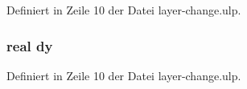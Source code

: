Definiert in Zeile 10 der Datei layer-\/change.\+ulp.

\hypertarget{layer-change_8ulp_a5e9a2bb87d9944b591c7b364e25eabb6}{}
\subsubsection[{dy}]{\setlength{\rightskip}{0pt plus 5cm}real dy}\label{layer-change_8ulp_a5e9a2bb87d9944b591c7b364e25eabb6}


Definiert in Zeile 10 der Datei layer-\/change.\+ulp.

